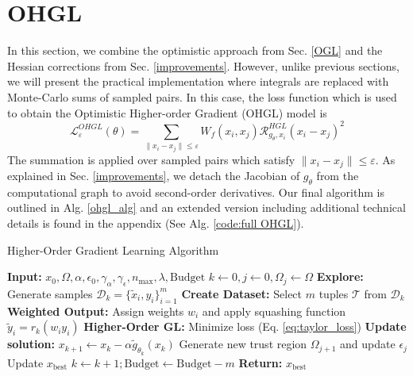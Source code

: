 \section{OHGL} 
\label{findings}
In this section, we combine the optimistic approach from Sec. \ref{OGL} and the Hessian corrections from Sec. \ref{improvements}. However, unlike previous sections, we will present the practical implementation where integrals are replaced with Monte-Carlo sums of sampled pairs. In this case, the loss function which is used to obtain the Optimistic Higher-order Gradient (OHGL) model is
\begin{equation}
\label{eq:taylor_loss}
\mathcal{L}_{\varepsilon}^{OHGL}(\theta) = \sum_{\|x_i - x_j\| \leq \varepsilon} W_f(x_i, x_j)\mathcal{R}_{g_\theta, x_i}^{HGL}(x_i - x_j)^2
\end{equation}
The summation is applied over sampled pairs which satisfy \(\|x_i - x_j\|\leq\varepsilon\). As explained in Sec. \ref{improvements}, we detach the Jacobian of \(g_{\theta}\) from the computational graph to avoid second-order derivatives. Our final algorithm is outlined in Alg. \ref{ohgl_alg} and an extended version including additional technical details is found in the appendix (See Alg. \ref{code:full OHGL}).

\begin{algorithm}[tb]
   \caption{Higher-Order Gradient Learning Algorithm}
   \label{ohgl_alg}
\begin{algorithmic}
   \STATE \textbf{Input:} $x_0, \Omega, \alpha, \epsilon_0, \gamma_{\alpha}, \gamma_{\epsilon}, n_{\max}, \lambda, \text{Budget}$
   \STATE $k \gets 0, j \gets 0, \Omega_j \gets \Omega$
      \STATE \textbf{Explore:} Generate samples $\mathcal{D}_k = \{\tilde{x}_i, y_i\}_{i=1}^m$ 
      \STATE \textbf{Create Dataset:} Select $m$ tuples $\mathcal{T}$ from $\mathcal{D}_k$
      \STATE \textbf{Weighted Output:} Assign weights $w_i$ and apply squashing function $\tilde{y}_i = r_k(w_i y_i)$
      \STATE \textbf{Higher-Order GL:} Minimize loss (Eq. \ref{eq:taylor_loss})
      \STATE \textbf{Update solution:} $x_{k+1} \gets x_k - \alpha \tilde{g}_{\theta_k}(x_k)$
         \STATE Generate new trust region $\Omega_{j+1}$ and update $\epsilon_j$
      \ENDIF
         \STATE Update $x_{\text{best}}$
      \ENDIF
      \STATE $k \gets k + 1; \text{Budget} \gets \text{Budget} - m$
   \ENDWHILE
   \STATE \textbf{Return:} $x_{\text{best}}$
\end{algorithmic}
\label{ohgl_alg}
\end{algorithm}